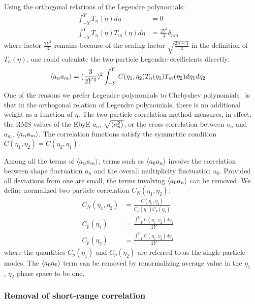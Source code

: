 Using the orthogonal relations of the Legendre polynomials:
\begin{equation}
\begin{split}
\int_{-Y}^Y T_n(\eta) d\eta &= 0 \\
\int_{-Y}^Y T_n(\eta) T_m(\eta) d\eta &= \frac{2Y^2}{3}\delta_{nm}
\end{split}
\end{equation}
where factor $\frac{2Y^2}{3}$ remains because of the scaling factor $\sqrt{\frac{2n+1}{3}}$ in the definition of $T_n(\eta)$, one could calculate the two-particle Legendre coefficients directly:
\begin{equation}
\left\langle a_n a_m\right\rangle = (\frac{3}{2Y^3})^2 \int_{-Y}^Y C(\eta_1, \eta_2) T_n(\eta_1) T_m(\eta_2) d\eta_1 d\eta_2
\end{equation}
One of the reasons we prefer Legendre polynomials to Chebyshev polynomials~\cite{Bzdak:2012tp} is that in the orthogonal relation of Legendre polynomials, there is no additional weight as a function of $\eta$. The two-particle correlation method measures, in effect, the RMS values of the EbyE $a_n$, $\sqrt{\left\langle a_n^2\right\rangle}$, or the cross correlation between $a_n$ and $a_m$, $\left\langle a_n a_m\right\rangle$. The correlation functions satisfy the symmetric condition $C(\eta_1, \eta_2) = C(\eta_2, \eta_1)$.

Among all the terms of $\left\langle a_n a_m\right\rangle$, terms such as $\left\langle a_0 a_n\right\rangle$ involve the correlation between shape fluctuation $a_n$ and the overall multiplicity fluctuation $a_0$. Provided all deviations from one are small, the terms involving $\left\langle a_0 a_n\right\rangle$ can be removed. We define normalized two-particle correlation $C_N(\eta_1, \eta_2)$:
\begin{equation}
\begin{split}
C_N(\eta_1, \eta_2) &= \frac{C(\eta_1, \eta_2)}{C_p(\eta_1) C_p(\eta_2)} \\
C_p(\eta_1) &= \frac{\int_{-Y}^Y C(\eta_1, \eta_2) d\eta_2}{2Y} \\
C_p(\eta_2) &= \frac{\int_{-Y}^Y C(\eta_1, \eta_2) d\eta_1}{2Y}
\end{split}
\end{equation}
where the quantities $C_p(\eta_1)$ and $C_p(\eta_2)$ are referred to as the single-particle modes. The $\left\langle a_0 a_0\right\rangle$ term can be removed by renormalizing average value in the $\eta_1$, $\eta_2$ phase space to be one.



\subsubsection{Removal of short-range correlation}

